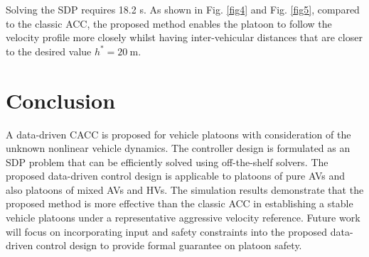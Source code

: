 \documentclass[letterpaper, 10 pt, conference]{ieeeconf}
\begin{document}
Solving the SDP requires 18.2 s.  
As shown in Fig. \ref{fig4} and Fig. \ref{fig5}, compared to the classic ACC, the proposed method enables the platoon to follow the velocity profile more closely whilst having inter-vehicular distances that are closer to the desired value $h^* = 20~\mathrm{m}$.
	
\section{Conclusion} \label{sec:conclusion}
A data-driven CACC is proposed for vehicle platoons with consideration 
of the unknown nonlinear vehicle dynamics. The controller design is formulated 
	as an SDP problem that can be efficiently solved using 
	off-the-shelf solvers. The proposed data-driven control design is applicable to 
	platoons of pure AVs and also platoons of mixed AVs and HVs. The simulation 
	results demonstrate that the proposed method is more effective than the classic ACC in establishing a stable vehicle platoons under a representative aggressive velocity reference. Future work will focus on incorporating input and safety 
	constraints into the proposed data-driven control design to provide formal 
	guarantee on platoon safety.
	
	
	 
	
	
	
\end{document}
